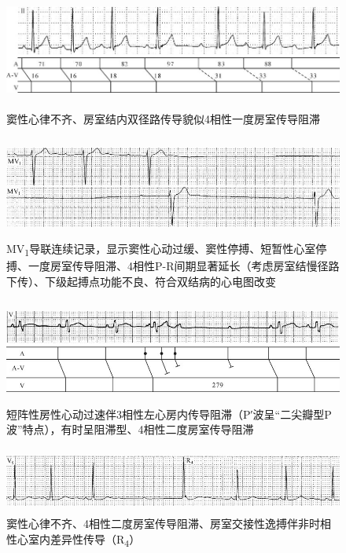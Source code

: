 \begin{figure}[!htbp]
 \centering
 \includegraphics[width=5.92708in,height=1.54167in]{./images/Image00375.jpg}
 \captionsetup{justification=centering}
 \caption{窦性心律不齐、房室结内双径路传导貌似4相性一度房室传导阻滞}
 \label{fig22-9}
  \end{figure} 

\begin{figure}[!htbp]
 \centering
 \includegraphics[width=5.58333in,height=1.32292in]{./images/Image00376.jpg}
 \captionsetup{justification=centering}
 \caption{MV\textsubscript{1}导联连续记录，显示窦性心动过缓、窦性停搏、短暂性心室停搏、一度房室传导阻滞、4相性P-R间期显著延长（考虑房室结慢径路下传）、下级起搏点功能不良、符合双结病的心电图改变}
 \label{fig22-10}
  \end{figure} 


\begin{figure}[!htbp]
 \centering
 \includegraphics[width=5.61458in,height=1.36458in]{./images/Image00377.jpg}
 \captionsetup{justification=centering}
 \caption{短阵性房性心动过速伴3相性左心房内传导阻滞（P′波呈“二尖瓣型P波”特点），有时呈阻滞型、4相性二度房室传导阻滞}
 \label{fig22-11}
  \end{figure} 

\begin{figure}[!htbp]
 \centering
 \includegraphics[width=5.58333in,height=0.85417in]{./images/Image00378.jpg}
 \captionsetup{justification=centering}
 \caption{窦性心律不齐、4相性二度房室传导阻滞、房室交接性逸搏伴非时相性心室内差异性传导（R\textsubscript{4}）}
 \label{fig22-12}
  \end{figure} 


